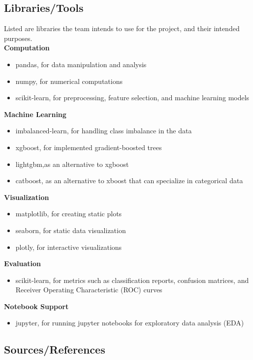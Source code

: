 \documentclass[12pt]{article}
\begin{document}
\subsection*{Libraries/Tools}
Listed are libraries the team intends to use for the project, and their intended purposes. \\
\textbf{Computation}
\begin{itemize}
    \item pandas, for data manipulation and analysis
    \item numpy, for numerical computations
    \item scikit-learn, for preprocessing, feature selection, and machine learning models
\end{itemize}

\textbf{Machine Learning}
\begin{itemize}
    \item imbalanced-learn, for handling class imbalance in the data
    \item xgboost, for implemented gradient-boosted trees
    \item lightgbm,as an alternative to xgboost
    \item catboost, as an alternative to xboost that can specialize in categorical data
\end{itemize}

\textbf{Visualization}
\begin{itemize}
    \item matplotlib, for creating static plots
    \item seaborn, for static data visualization
    \item plotly, for interactive visualizations
\end{itemize}

\textbf{Evaluation}
\begin{itemize}
    \item scikit-learn, for metrics such as classification reports, confusion matrices, and Receiver Operating Characteristic (ROC) curves
\end{itemize}

\textbf{Notebook Support}
\begin{itemize}
    \item jupyter, for running jupyter notebooks for exploratory data analysis (EDA)
\end{itemize}

\subsection*{Sources/References}
\end{document}
